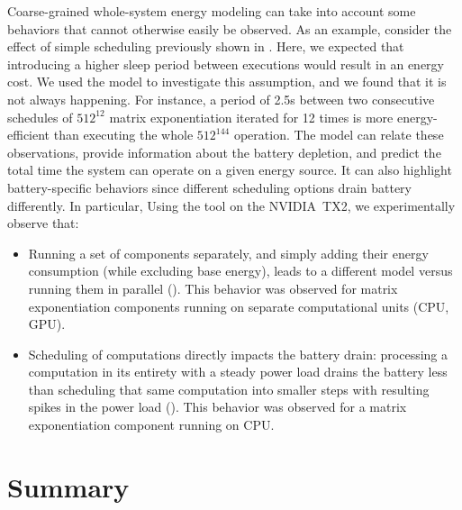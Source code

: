 Coarse-grained whole-system energy modeling can take into account some behaviors that cannot otherwise easily be observed. %
As an example, consider the effect of simple scheduling previously shown in . Here, we expected that introducing a higher sleep period between executions would result in an energy cost. We used the model to investigate this assumption, and we found that it is not always happening. For instance, a period of 2.5s between two consecutive schedules of $512^{12}$ matrix exponentiation iterated for 12 times is more energy-efficient than executing the whole $512^{144}$ operation. The model can relate these observations, provide information about the battery depletion, and predict the total time the system can operate on a given energy source. It can also highlight battery-specific behaviors since different scheduling options drain battery differently. In particular, Using the \powprof{} tool on the NVIDIA~TX2, we experimentally observe that:
\begin{itemize}
  \item Running a set of components separately, and simply adding their energy consumption (while excluding base energy), leads to a different model versus running them in parallel (). This behavior was observed for matrix exponentiation components running on separate computational units (CPU, GPU).
  \item Scheduling of computations directly impacts the battery drain: processing a computation in its entirety with a steady power load drains the battery less than scheduling that same computation into smaller steps with resulting spikes in the power load (). This behavior was observed for a matrix exponentiation component running on CPU.
\end{itemize}


\section{\color{red}Summary}

